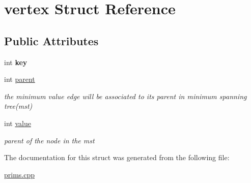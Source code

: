 \hypertarget{structvertex}{\section{vertex Struct Reference}
\label{structvertex}
}
\subsection*{Public Attributes}
\begin{DoxyCompactItemize}
\item 
\hypertarget{structvertex_a1d6346092fd601003069f1f525e60857}{int {\bfseries key}}\label{structvertex_a1d6346092fd601003069f1f525e60857}

\item 
\hypertarget{structvertex_a5105af46f7774aec84e65c7546cfb847}{int \hyperlink{structvertex_a5105af46f7774aec84e65c7546cfb847}{parent}}\label{structvertex_a5105af46f7774aec84e65c7546cfb847}

\begin{DoxyCompactList}\small\item\em the minimum value edge will be associated to its parent in minimum spanning tree(mst) \end{DoxyCompactList}\item 
\hypertarget{structvertex_ac689f619c6c679a034c8c6519a48c6d4}{int \hyperlink{structvertex_ac689f619c6c679a034c8c6519a48c6d4}{value}}\label{structvertex_ac689f619c6c679a034c8c6519a48c6d4}

\begin{DoxyCompactList}\small\item\em parent of the node in the mst \end{DoxyCompactList}\end{DoxyCompactItemize}


The documentation for this struct was generated from the following file\-:\begin{DoxyCompactItemize}
\item 
\hyperlink{prims_8cpp}{prims.\-cpp}\end{DoxyCompactItemize}
